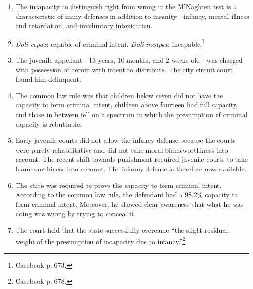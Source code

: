 \begin{enumerate}
    \item The incapacity to distinguish right from wrong in the M'Naghten test 
    is a characteristic of many defenses in addition to insanity---infancy, 
    mental illness and retardation, and involuntary intoxication.
    \item \emph{Doli capax}: capable of criminal intent. \emph{Doli incapax}: 
    incapable.\footnote{Casebook p. 673.}
    \item The juvenile appellant---13 years, 10 months, and 2 weeks old---was 
    charged with possession of heroin with intent to distribute. The city 
    circuit court found him delinquent.
    \item The common law rule was that children below seven did not have the 
    capacity to form criminal intent, children above fourteen had full 
    capacity, and those in between fell on a spectrum in which the presumption 
    of criminal capacity is rebuttable.
    \item Early juvenile courts did not allow the infancy defense because the 
    courts were purely rehabilitative and did not take moral blameworthiness 
    into account. The recent shift towards punishment required juvenile courts 
    to take blameworthiness into account. The infancy defense is therefore now 
    available.
    \item The state was required to prove the capacity to form criminal 
    intent. According to the common law rule, the defendant had a 98.2\% 
    capacity to form criminal intent. Moreover, he showed clear awareness that 
    what he was doing was wrong by trying to conceal it.
    \item The court held that the state successfully overcame ``the slight 
    residual weight of the presumption of incapacity due to 
    infancy.''\footnote{Casebook p. 678.}
\end{enumerate}
